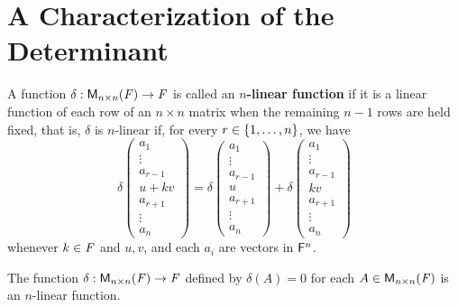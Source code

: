 \section{A Characterization of the Determinant}\label{sec:4.5}

\begin{defn}\label{4.5.1}
	A function \(\delta : \ms[n][n][\F] \to \F\) is called an \textbf{\(n\)-linear function} if it is a linear function of each row of an \(n \times n\) matrix when the remaining \(n - 1\) rows are held fixed, that is, \(\delta\) is \(n\)-linear if, for every \(r \in \left\lbrace1, \dots, n\right\rbrace\), we have
	\[
		\delta\begin{pmatrix}
			a_1       \\
			\vdots    \\
			a_{r - 1} \\
			u + kv    \\
			a_{r + 1} \\
			\vdots    \\
			a_n
		\end{pmatrix} = \delta\begin{pmatrix}
			a_1       \\
			\vdots    \\
			a_{r - 1} \\
			u         \\
			a_{r + 1} \\
			\vdots    \\
			a_n
		\end{pmatrix} + \delta\begin{pmatrix}
			a_1       \\
			\vdots    \\
			a_{r - 1} \\
			kv        \\
			a_{r + 1} \\
			\vdots    \\
			a_n
		\end{pmatrix}
	\]
	whenever \(k \in \mathit{F}\) and \(u, v\), and each \(a_i\) are vectors in \(\mathsf{F}^n\).
\end{defn}

\begin{eg}\label{4.5.2}
	The function \(\delta : \ms[n][n][\F] \to \F\) defined by \(\delta(A) = 0\) for each \(A \in \ms[n][n][\F]\) is an \(n\)-linear function.
\end{eg}

